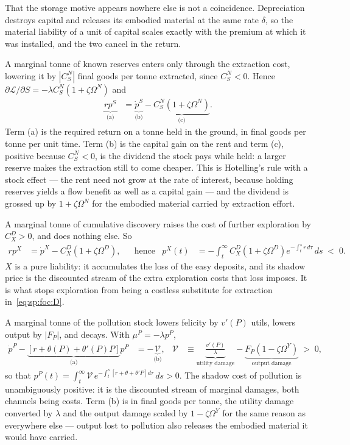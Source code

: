 That the storage motive appears nowhere else is not a coincidence. Depreciation destroys capital and releases its embodied material at the same rate $\delta$, so the material liability of a unit of capital scales exactly with the premium at which it was installed, and the two cancel in the return.

 A marginal tonne of known reserves enters only through the extraction cost, lowering it by $\left|C^N_S\right|$ final goods per tonne extracted, since $C^N_S<0$. Hence $\partial\mathcal L/\partial S=-\lambda C^N_S\left(1+\zeta\Omega^N\right)$ and
\begin{align}
\underbrace{rp^S}_{\text{(a)}} &= \underbrace{\dot p^S}_{\text{(b)}} - \underbrace{C^N_S\left(1+\zeta\Omega^N\right)}_{\text{(c)}} .
\label{eq:sp:costate:S}
\end{align}
Term (a) is the required return on a tonne held in the ground, in final goods per tonne per unit time. Term (b) is the capital gain on the rent and term (c), positive because $C^N_S<0$, is the dividend the stock pays while held: a larger reserve makes the extraction still to come cheaper. This is Hotelling's rule with a stock effect --- the rent need not grow at the rate of interest, because holding reserves yields a flow benefit as well as a capital gain --- and the dividend is grossed up by $1+\zeta\Omega^N$ for the embodied material carried by extraction effort.

 A marginal tonne of cumulative discovery raises the cost of further exploration by $C^D_X>0$, and does nothing else. So
\begin{align}
rp^X &= \dot p^X - C^D_X\left(1+\zeta\Omega^D\right),
&&\text{hence}
&
p^X(t) &= -\int_t^\infty C^D_X\left(1+\zeta\Omega^D\right)e^{-\int_t^s r\,d\tau}\,ds\;<\;0 .
\label{eq:sp:costate:X}
\end{align}
$X$ is a pure liability: it accumulates the loss of the easy deposits, and its shadow price is the discounted stream of the extra exploration costs that loss imposes. It is what stops exploration from being a costless substitute for extraction in~\eqref{eq:sp:foc:D}.

 A marginal tonne of the pollution stock lowers felicity by $v'\left(P\right)$ utils, lowers output by $\left|F_P\right|$, and decays. With $\mu^P=-\lambda p^P$,
\begin{align}
\dot p^P-\underbrace{\left[r+\theta\left(P\right)+\theta'\left(P\right)P\right]}_{\text{(a)}}p^P &= -\underbrace{\mathcal V}_{\text{(b)}},
&
\mathcal V &\equiv \underbrace{\frac{v'\left(P\right)}{\lambda}}_{\text{utility damage}}-\underbrace{F_P\left(1-\zeta\Omega^Y\right)}_{\text{output damage}}\;>\;0,
\label{eq:sp:costate:P}
\end{align}
so that $p^P(t)=\int_t^\infty\mathcal V\,e^{-\int_t^s\left[r+\theta+\theta'P\right]d\tau}\,ds>0$. The shadow cost of pollution is unambiguously positive: it is the discounted stream of marginal damages, both channels being costs. Term (b) is in final goods per tonne, the utility damage converted by $\lambda$ and the output damage scaled by $1-\zeta\Omega^Y$ for the same reason as everywhere else --- output lost to pollution also releases the embodied material it would have carried.

